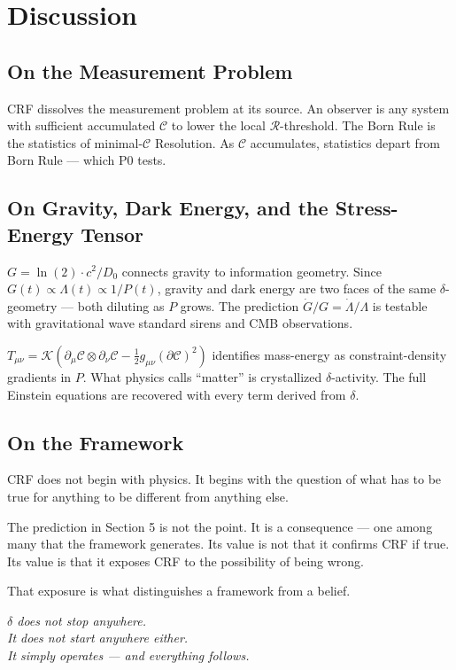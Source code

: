 \documentclass[12pt]{article}
\begin{document}
\section{Discussion}

\subsection{On the Measurement Problem}

CRF dissolves the measurement problem at its source. An observer is
any system with sufficient accumulated $\mathcal{C}$ to lower the
local $\mathcal{R}$-threshold. The Born Rule is the statistics of
minimal-$\mathcal{C}$ Resolution. As $\mathcal{C}$ accumulates,
statistics depart from Born Rule --- which P0 tests.

\subsection{On Gravity, Dark Energy, and the Stress-Energy Tensor}

$G = \ln(2)\cdot c^2/D_0$ connects gravity to information geometry.
Since $G(t) \propto \Lambda(t) \propto 1/P(t)$, gravity and dark
energy are two faces of the same $\delta$-geometry --- both diluting
as $P$ grows. The prediction $\dot{G}/G = \dot{\Lambda}/\Lambda$
is testable with gravitational wave standard sirens and CMB
observations.

$T_{\mu\nu} = \mathcal{K}(\partial_\mu\mathcal{C}\otimes
\partial_\nu\mathcal{C} - \frac{1}{2}g_{\mu\nu}(\partial\mathcal{C})^2)$
identifies mass-energy as constraint-density gradients in $P$.
What physics calls ``matter'' is crystallized $\delta$-activity.
The full Einstein equations are recovered with every term derived
from $\delta$.

\subsection{On the Framework}

CRF does not begin with physics. It begins with the question of
what has to be true for anything to be different from anything else.

The prediction in Section 5 is not the point. It is a consequence
--- one among many that the framework generates. Its value is not
that it confirms CRF if true. Its value is that it exposes CRF to
the possibility of being wrong.

That exposure is what distinguishes a framework from a belief.

\bigskip
\begin{center}
\itshape
$\delta$ does not stop anywhere.\\
It does not start anywhere either.\\
It simply operates --- and everything follows.
\end{center}
\end{document}
